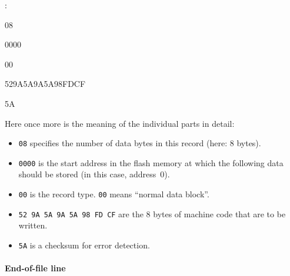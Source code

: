 \documentclass[a4paper,12pt]{article}
\begin{document}
\begin{center}
\begin{minipage}{\textwidth}
\ttfamily
\colorbox{gray!20}{\strut\textcolor{black}{:}}%
\colorbox{myblue!20}{\strut08}%
\colorbox{cyan!20}{\strut0000}%
\colorbox{violet!20}{\strut00}%
\colorbox{green!10}{\strut529A5A9A5A98FDCF}%
\colorbox{red!20}{\strut5A}

\vspace{0.2cm}

\hspace{1cm}%
\end{minipage}
\end{center}

\noindent
Here once more is the meaning of the individual parts in detail:
\begin{itemize}
    \item
	\texttt{08} specifies the number of data bytes in this record
	(here: 8 bytes).
    \item
	\texttt{0000} is the start address in the flash memory at which the
	following data should be stored (in this case, address~0).
    \item
	\texttt{00} is the record type. \texttt{00} means ``normal data
	block''.
    \item
	\texttt{52 9A 5A 9A 5A 98 FD CF} are the 8 bytes of machine code that
	are to be written.
    \item
	\texttt{5A} is a checksum for error detection.
\end{itemize}

\paragraph{End-of-file line}
\end{document}

